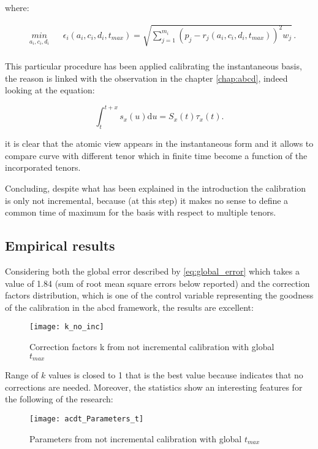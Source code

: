where:

\begin{equation*}
\begin{aligned}
& \underset{a_{i},c_{i},d_{i}}{min}
& & \epsilon_{i}(a_{i},c_{i},d_{i},t_{max})=\sqrt{\sum_{j=1}^{m_{i}}(p_{j}-r_{j}(a_{i},c_{i},d_{i},t_{max}))^{2}w_{j}} \,.\\
\end{aligned}
\end{equation*}

This particular procedure has been applied calibrating the instantaneous basis, the reason is linked with the observation in the chapter \eqref{chap:abcd}, indeed looking at the equation:

\begin{equation}
\int_t^{t+x} s_x(u) \mathrm{d}u = S_x(t) \tau_x(t).
\end{equation}

it is clear that the atomic view appears in the instantaneous form and it allows to compare curve with different tenor which in finite time become a function of the incorporated tenors.

Concluding, despite what has been explained in the introduction the calibration is only not incremental, because (at this step) it makes no sense to define a common time of maximum for the basis with respect to multiple tenors.

\subsection{Empirical results}

Considering both the global error described by \eqref{eq:global_error} which takes a value of 1.84 (sum of root mean square errors below reported) and the correction factors distribution, which is one of the control variable representing the goodness of the calibration in the abcd framework, the results are excellent:

\begin{figure}[H]
\centering
\texttt{[image: k\_no\_inc]}
\caption{Correction factors k from not incremental calibration with global $t_{max}$}
\label{fig:k_no_inc_global_t}
\end{figure}

Range of $k$ values is closed to 1 that is the best value because indicates that no corrections are needed.
Moreover, the statistics show an interesting features for the following of the research:

\begin{figure}[H]
\centering
\texttt{[image: acdt\_Parameters\_t]}
\caption{Parameters from not incremental calibration with global $t_{max}$}
\label{fig:parameters_no_inc_global_t}
\end{figure}

